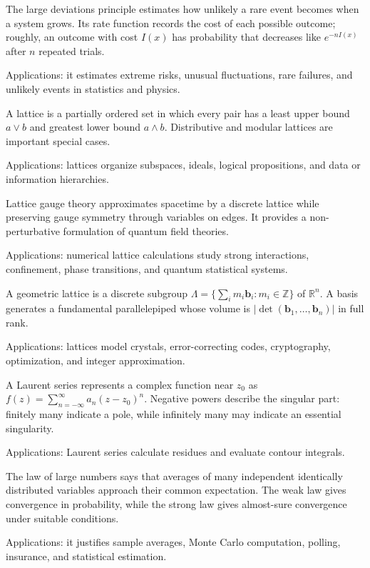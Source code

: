 The large deviations principle estimates how unlikely a rare event becomes when a system grows. Its rate function records the cost of each possible outcome; roughly, an outcome with cost $I(x)$ has probability that decreases like $e^{-nI(x)}$ after $n$ repeated trials. \par\noindent Applications: it estimates extreme risks, unusual fluctuations, rare failures, and unlikely events in statistics and physics.

A lattice is a partially ordered set in which every pair has a least upper bound $a\vee b$ and greatest lower bound $a\wedge b$. Distributive and modular lattices are important special cases. \par\noindent Applications: lattices organize subspaces, ideals, logical propositions, and data or information hierarchies.

Lattice gauge theory approximates spacetime by a discrete lattice while preserving gauge symmetry through variables on edges. It provides a non-perturbative formulation of quantum field theories. \par\noindent Applications: numerical lattice calculations study strong interactions, confinement, phase transitions, and quantum statistical systems.

A geometric lattice is a discrete subgroup $\Lambda=\{\sum_i m_i\mathbf b_i:m_i\in\mathbb Z\}$ of $\mathbb R^n$. A basis generates a fundamental parallelepiped whose volume is $|\det(\mathbf b_1,\ldots,\mathbf b_n)|$ in full rank. \par\noindent Applications: lattices model crystals, error-correcting codes, cryptography, optimization, and integer approximation.

A Laurent series represents a complex function near $z_0$ as $f(z)=\sum_{n=-\infty}^{\infty}a_n(z-z_0)^n$. Negative powers describe the singular part: finitely many indicate a pole, while infinitely many may indicate an essential singularity. \par\noindent Applications: Laurent series calculate residues and evaluate contour integrals.

The law of large numbers says that averages of many independent identically distributed variables approach their common expectation. The weak law gives convergence in probability, while the strong law gives almost-sure convergence under suitable conditions. \par\noindent Applications: it justifies sample averages, Monte Carlo computation, polling, insurance, and statistical estimation.

